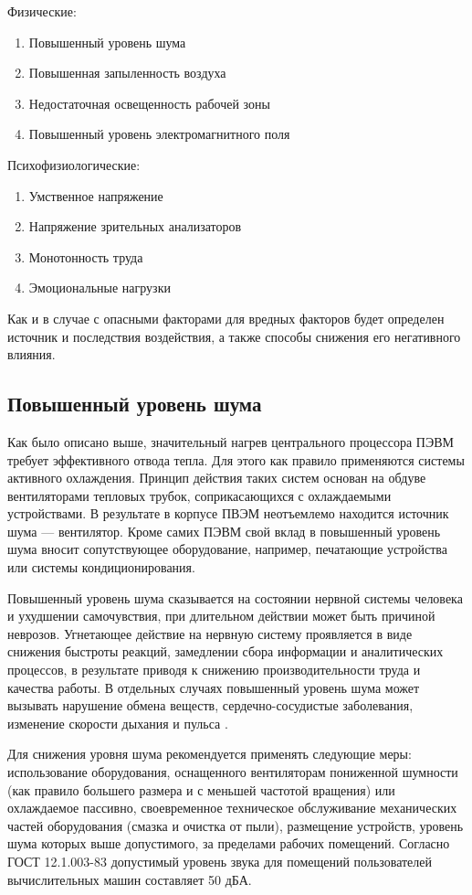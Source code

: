\documentclass[14pt,oneside,final]{extreport}
\begin{document}
	\noindent Физические:
		\begin{enumerate}[label*=1.\arabic*.]
	 		\item Повышенный уровень шума
	 		\item Повышенная запыленность воздуха
	 		\item Недостаточная освещенность рабочей зоны
	 		\item Повышенный уровень электромагнитного поля
		\end{enumerate}
	Психофизиологические:
		\begin{enumerate}[label*=2.\arabic*.]
			\item Умственное напряжение 
			\item Напряжение зрительных анализаторов
			\item Монотонность труда
			\item Эмоциональные нагрузки
		\end{enumerate}

	Как и в случае с опасными факторами для вредных факторов будет определен источник и последствия воздействия, а также способы снижения его негативного влияния.
	
	\subsection{Повышенный уровень шума}
	Как было описано выше, значительный нагрев центрального процессора ПЭВМ требует эффективного отвода тепла. Для этого как правило применяются системы активного охлаждения. Принцип действия таких систем основан на обдуве вентиляторами тепловых трубок, соприкасающихся с охлаждаемыми устройствами. В результате в корпусе ПВЭМ неотъемлемо находится источник шума --- вентилятор. Кроме самих ПЭВМ свой вклад в повышенный уровень шума вносит сопутствующее оборудование, например, печатающие устройства или системы кондиционирования. 
	
	Повышенный уровень шума сказывается на состоянии нервной системы человека и ухудшении самочувствия, при длительном действии может быть причиной неврозов. Угнетающее действие на нервную систему проявляется в виде снижения быстроты реакций, замедлении сбора информации и аналитических процессов, в результате приводя к снижению производительности труда и качества работы. В отдельных случаях повышенный уровень шума может вызывать нарушение обмена веществ, сердечно-сосудистые заболевания, изменение скорости дыхания и пульса \cite{book:BZD}. 
 
	
	Для снижения уровня шума рекомендуется применять следующие меры: использование оборудования, оснащенного вентиляторам пониженной шумности (как правило большего размера и с меньшей частотой вращения) или охлаждаемое пассивно, своевременное техническое обслуживание механических частей оборудования (смазка и очистка от пыли), размещение устройств, уровень шума которых выше допустимого, за пределами рабочих помещений. Согласно ГОСТ 12.1.003-83 допустимый уровень звука для помещений пользователей вычислительных машин составляет 50 дБА.
\end{document}
